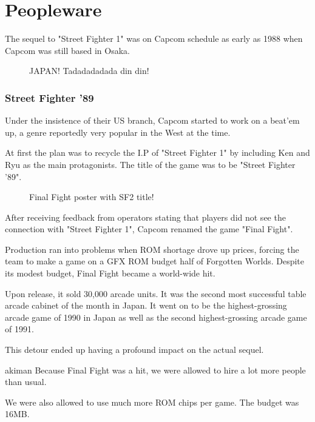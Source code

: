 \chapter{Peopleware} 


The sequel to "Street Fighter 1" was on Capcom schedule as early as 1988 when Capcom was still based in Osaka.

\begin{figure}[H]
\caption*{JAPAN! Tadadadadada din din!}
\end{figure}








\subsection{Street Fighter '89}
Under the insistence of their US branch, Capcom started to work on a beat'em up, a genre reportedly very popular in the West at the time.

At first the plan was to recycle the I.P of "Street Fighter 1" by including Ken and Ryu as the main protagonists. The title of the game was to be "Street Fighter '89".

\begin{figure}[H]
\caption*{Final Fight poster with SF2 title!}
\end{figure}

After receiving feedback from operators stating that players did not see the connection with "Street Fighter 1", Capcom renamed the game "Final Fight".

Production ran into problems when ROM shortage drove up prices, forcing the team to make a game on a GFX ROM budget half of Forgotten Worlds. Despite its modest budget, Final Fight became a world-wide hit.

Upon release, it sold 30,000 arcade units. It was the second most successful table arcade cabinet of the month in Japan. It went on to be the highest-grossing arcade game of 1990 in Japan as well as the second highest-grossing arcade game of 1991. 

This detour ended up having a profound impact on the actual sequel. 

\begin{q}{akiman\cite{gameMaestro4}}
  Because Final Fight was a hit, we were allowed to hire a lot more people than usual. 

  We were also allowed to use much more ROM chips per game. The budget was 16MB.
\end{q}






